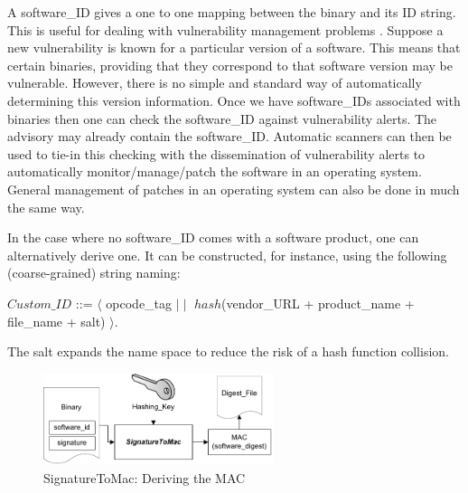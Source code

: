 
A software\_ID gives a one to one mapping between the binary and its ID string.
This is useful for dealing with vulnerability management problems \cite{sufatrio2004amo}.
Suppose a new vulnerability is known for a particular version of a software.
This means that certain binaries, providing that they correspond to that
software version may be vulnerable. However, there is no simple and standard
way of automatically determining this version information.
Once we have software\_IDs associated with binaries then one can check
the software\_ID against vulnerability alerts. The advisory may
already contain the software\_ID. 
Automatic scanners can then be used
to tie-in this checking with the dissemination of vulnerability alerts
to automatically monitor/manage/patch the software in an operating system.
General management of patches in an operating system can also be done
in much the same way.

In the case where no software\_ID comes with a software product,
one can alternatively derive one.
It can be constructed, for instance, using the following (coarse-grained) string naming:
\begin{center}
\small
$Custom\_ID$ ::= $\langle$ opcode\_tag $\mid\mid$
$hash$(vendor\_URL + product\_name + file\_name + salt) $\rangle$.
\end{center}
The salt expands the name space to reduce the risk of a hash function collision.

\begin{figure}[tb]
\begin{center}
\includegraphics[width=0.6\textwidth]{binauth/hashing}
\caption{SignatureToMac: Deriving the MAC}
\label{fig:hashing}
\end{center}
\end{figure}

